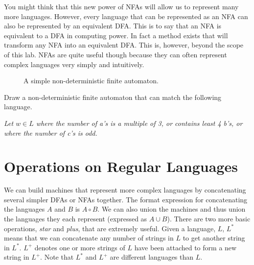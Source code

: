 You might think that this new power of NFAs will allow us to represent many more languages.
However, every language that can be represented as an NFA can also be represented by an equivalent DFA.
This is to say that an NFA is equivalent to a DFA in computing power.
In fact a method exists that will transform any NFA into an equivalent DFA.
This is, however, beyond the scope of this lab.
NFAs are quite useful though because they can often represent complex languages very simply and intuitively.
\begin{figure}
\caption{A simple non-deterministic finite automaton.}
\label{fig:simple_nfa}
\end{figure}

\begin{problem}
Draw a non-deterministic finite automaton that can match the following language.

\emph{Let $w \in L$ where the number of a's is a multiple of 3, or contains least 4 b's, or where the number of c's is odd.}
\label{prob:drawnfa}
\end{problem}


\section*{Operations on Regular Languages}
We can build machines that represent more complex languages by concatenating several simpler DFAs or NFAs together.
The format expression for concatenating the languages $A$ and $B$ is $A \circ B$.
We can also union the machines and thus union the languages they each represent (expressed as $A \cup B$).  
There are two more basic operations, \emph{star} and \emph{plus}, that are extremely useful.
Given a language, $L$, $L^*$ means that we can concatenate any number of strings in $L$ to get another string in $L^*$.  $L^+$ denotes one or more strings of $L$ have been attached to form a new string in $L^+$.
Note that $L^*$ and $L^+$ are different languages than $L$.

